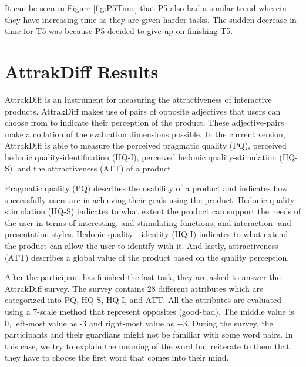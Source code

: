 It can be seen in Figure \ref{fig:P5Time} that P5 also had a similar trend wherein they have increasing time as they are given harder tasks. The sudden decrease in time for T5 was because P5 decided to give up on finishing T5.

\section{AttrakDiff Results}
AttrakDiff is an instrument for measuring the attractiveness of interactive products. AttrakDiff makes use of pairs of opposite adjectives that users can choose from to indicate their perception of the product. These adjective-pairs make a collation of the evaluation dimensions possible. In the current version, AttrakDiff is able to measure the perceived pragmatic quality (PQ), perceived hedonic quality-identification (HQ-I), perceived hedonic quality-stimulation (HQ-S), and the attractiveness (ATT) of a product.

Pragmatic quality (PQ) describes the usability of a product and indicates  how successfully users are in achieving their goals using the product. Hedonic quality - stimulation (HQ-S) indicates to what extent the product can support the needs of the user in terms of interesting, and stimulating functions, and interaction- and presentation-styles. Hedonic quality - identity (HQ-I) indicates to what extend the product can allow the user to identify with it. And lastly, attractiveness (ATT) describes a global value of the product based on the quality perception.

After the participant has finished the last task, they are asked to answer the AttrakDiff survey. The survey contains 28 different attributes which are categorized into PQ, HQ-S, HQ-I, and ATT. All the attributes are evaluated using a 7-scale method that represent opposites (good-bad). The middle value is 0, left-most value as -3 and right-most value as +3.  During the survey, the participants and their guardians might not be familiar with some word pairs. In this case, we try to explain the meaning of the word but reiterate to them that they have to choose the first word that comes into their mind.

